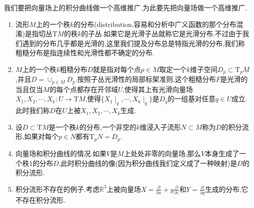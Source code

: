 我们要把向量场上的积分曲线做一个高维推广.为此要先把向量场做一个高维推广.
\begin{enumerate}
	\item 流形$M$上的一个秩$k$的分布(distribution,容易和分析中广义函数的那个分布混淆)是指切丛$\mathrm{T}M$的秩$k$的子丛.如果它是光滑子丛就称它是光滑分布.不过由于我们遇到的分布几乎都是光滑的,这里我们提及分布总是特指光滑的分布,我们称粗糙分布是指连续性和光滑性都不确定的分布.
	\item $M$上的一个秩$k$粗糙分布$D$就是指对每个点$p\in M$取定一个$k$维子空间$D_p\subset\mathrm{T}_pM$,并且$D=\cup_{p\in M}D_p$.按照子丛光滑性的局部标架准则,这个粗糙分布$F$是光滑的当且仅当$M$的每个点都存在开邻域$U$,使得其上有光滑向量场$X_1,X_2,\cdots,X_k:U\to\mathrm{T}M$,使得$\{X_1\mid_q,\cdots,X_k\mid_q\}$是$D_q$的一组基对任意$q\in U$成立.此时我们称$D$在$U$上被$X_1,X_2,\cdots,X_k$生成.
	\item 设$D\subset\mathrm{T}M$是一个秩$k$的分布,一个非空的$k$维浸入子流形$N\subset M$称为$D$的积分流形,如果对每个$p\in N$都有$\mathrm{T}_pN=D_p$.
	\item 向量场和积分曲线的情况.如果$V$是$M$上处处非零的向量场,那么$V$本身生成了一个秩1的分布$D$,此时积分曲线的像(因为积分曲线我们定义成了一种映射)是$D$的积分流形.
	\item 积分流形不存在的例子.考虑$\mathbb{R}^3$上被向量场$X=\frac{\partial}{\partial x}+y\frac{\partial}{\partial z}$和$Y=\frac{\partial}{\partial y}$生成的分布,它不存在积分流形.
\end{enumerate}

